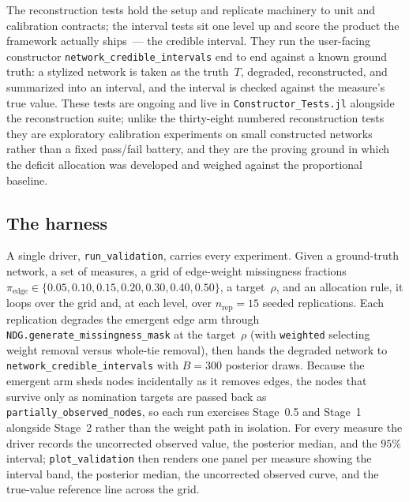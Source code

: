 \documentclass[11pt]{article}
\newcommand{\piedge}{\pi_{\text{edge}}}
\begin{document}
The reconstruction tests hold the setup and replicate machinery to unit and
calibration contracts; the interval tests sit one level up and score the product
the framework actually ships~--- the credible interval. They run the user-facing
constructor \texttt{network\_credible\_intervals} end to end against a known ground
truth: a stylized network is taken as the truth~$T$, degraded, reconstructed, and
summarized into an interval, and the interval is checked against the measure's true
value. These tests are ongoing and live in \texttt{Constructor\_Tests.jl} alongside
the reconstruction suite; unlike the thirty-eight numbered reconstruction tests they
are exploratory calibration experiments on small constructed networks rather than a
fixed pass/fail battery, and they are the proving ground in which the deficit
allocation was developed and weighed against the proportional baseline.

\subsection{The harness}

A single driver, \texttt{run\_validation}, carries every experiment. Given a
ground-truth network, a set of measures, a grid of edge-weight missingness fractions
$\piedge \in \{0.05, 0.10, 0.15, 0.20, 0.30, 0.40, 0.50\}$, a target~$\rho$, and an
allocation rule, it loops over the grid and, at each level, over $n_{\text{rep}} = 15$
seeded replications. Each replication degrades the emergent edge arm through
\texttt{NDG.generate\_missingness\_mask} at the target~$\rho$ (with \texttt{weighted}
selecting weight removal versus whole-tie removal), then hands the degraded network to
\texttt{network\_credible\_intervals} with $B = 300$ posterior draws. Because the
emergent arm sheds nodes incidentally as it removes edges, the nodes that survive only
as nomination targets are passed back as \texttt{partially\_observed\_nodes}, so each
run exercises Stage~0.5 and Stage~1 alongside Stage~2 rather than the weight path in
isolation. For every measure the driver records the uncorrected observed value, the
posterior median, and the $95\%$ interval; \texttt{plot\_validation} then renders one
panel per measure showing the interval band, the posterior median, the uncorrected
observed curve, and the true-value reference line across the grid.
\end{document}
